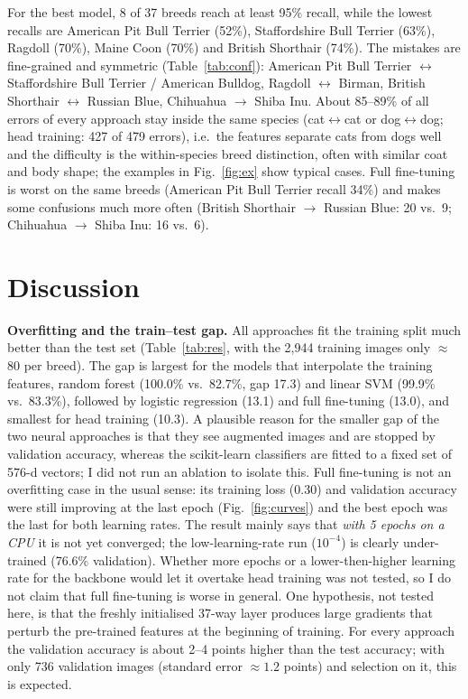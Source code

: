\documentclass[10pt,a4paper]{article}
\begin{document}
For the best model, 8 of 37 breeds reach at least 95\% recall, while the lowest recalls are American Pit Bull Terrier (52\%), Staffordshire Bull Terrier (63\%), Ragdoll (70\%), Maine Coon (70\%) and British Shorthair (74\%).
The mistakes are fine-grained and symmetric (Table~\ref{tab:conf}): American Pit Bull Terrier $\leftrightarrow$ Staffordshire Bull Terrier / American Bulldog, Ragdoll $\leftrightarrow$ Birman, British Shorthair $\leftrightarrow$ Russian Blue,
Chihuahua $\to$ Shiba Inu. About 85--89\% of all errors of every approach stay inside the same species (cat$\leftrightarrow$cat or dog$\leftrightarrow$dog; head training: 427 of 479 errors),
i.e.\ the features separate cats from dogs well and the difficulty is the within-species breed distinction, often with similar coat and body shape; the examples in Fig.~\ref{fig:ex} show typical cases.
Full fine-tuning is worst on the same breeds (American Pit Bull Terrier recall 34\%) and makes some confusions much more often (British Shorthair $\to$ Russian Blue: 20 vs.\ 9; Chihuahua $\to$ Shiba Inu: 16 vs.\ 6).

\section{Discussion}
\textbf{Overfitting and the train--test gap.} All approaches fit the training split much better than the test set (Table~\ref{tab:res}, with the 2{,}944 training images only $\approx$80 per breed).
The gap is largest for the models that interpolate the training features, random forest (100.0\% vs.\ 82.7\%, gap 17.3) and linear SVM (99.9\% vs.\ 83.3\%), followed by logistic regression (13.1) and full fine-tuning (13.0), and smallest for head training (10.3).
A plausible reason for the smaller gap of the two neural approaches is that they see augmented images and are stopped by validation accuracy, whereas the scikit-learn classifiers are fitted to a fixed set of 576-d vectors; I did not run an ablation to isolate this.
Full fine-tuning is not an overfitting case in the usual sense: its training loss (0.30) and validation accuracy were still improving at the last epoch (Fig.~\ref{fig:curves}) and the best epoch was the last for both learning rates. The result
mainly says that \emph{with 5 epochs on a CPU} it is not yet converged; the low-learning-rate run ($10^{-4}$) is clearly under-trained (76.6\% validation). Whether more epochs or a lower-then-higher learning rate for the backbone would let it overtake head training was not tested, so I do not claim that full fine-tuning is worse in general.
One hypothesis, not tested here, is that the freshly initialised 37-way layer produces large gradients that perturb the pre-trained features at the beginning of training.
For every approach the validation accuracy is about 2--4 points higher than the test accuracy; with only 736 validation images (standard error $\approx1.2$ points) and selection on it, this is expected.
\end{document}
